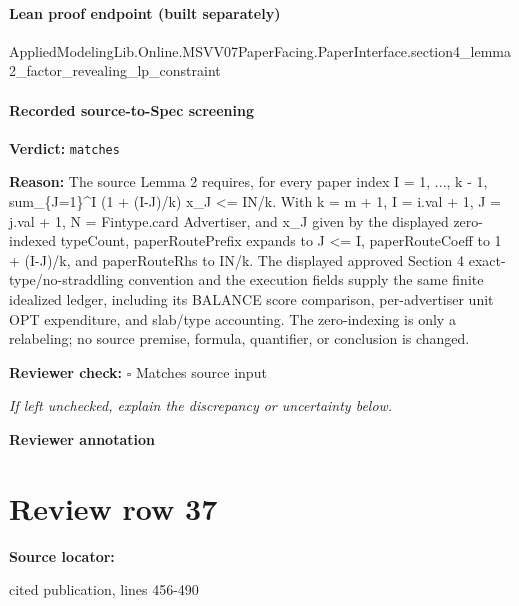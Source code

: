 \documentclass[10pt]{article}
\newcommand{\reviewerbox}{%
  \par\noindent\fbox{\parbox{0.96\linewidth}{\rule{0pt}{0.38in}}}\par
}
\newcommand{\reviewmatch}[1]{%
  \par\noindent\textbf{Reviewer check:} $\square$\; #1\par
  \noindent\emph{If left unchecked, explain the discrepancy or uncertainty below.}\par
}
\begin{document}
\paragraph{Lean proof endpoint (built separately)}\begin{ReviewVerbatim}
AppliedModelingLib.Online.MSVV07PaperFacing.PaperInterface.section4_lemma2_factor_revealing_lp_constraint
\end{ReviewVerbatim}

\paragraph{Recorded source-to-Spec screening}
\textbf{Verdict:} \texttt{matches}
\\
{\raggedright
\textbf{Reason:} The source Lemma 2 requires, for every paper index I = 1, .\allowbreak{}.\allowbreak{}.\allowbreak{}, k -\allowbreak{} 1, sum\_\allowbreak{}\{J=1\}\textasciicircum{}I (1 + (I-\allowbreak{}J)/\allowbreak{}k) x\_\allowbreak{}J <= IN/\allowbreak{}k.\allowbreak{}  With k = m + 1, I = i.\allowbreak{}val + 1, J = j.\allowbreak{}val + 1, N = Fintype.\allowbreak{}card Advertiser, and x\_\allowbreak{}J given by the displayed zero-\allowbreak{}indexed typeCount, paperRoutePrefix expands to J <= I, paperRouteCoeff to 1 + (I-\allowbreak{}J)/\allowbreak{}k, and paperRouteRhs to IN/\allowbreak{}k.\allowbreak{}  The displayed approved Section 4 exact-\allowbreak{}type/\allowbreak{}no-\allowbreak{}straddling convention and the execution fields supply the same finite idealized ledger, including its BALANCE score comparison, per-\allowbreak{}advertiser unit OPT expenditure, and slab/\allowbreak{}type accounting.\allowbreak{}  The zero-\allowbreak{}indexing is only a relabeling;\allowbreak{} no source premise, formula, quantifier, or conclusion is changed.\allowbreak{}
\par}
\reviewmatch{Matches source input}
\noindent\textbf{Reviewer annotation}\par
\reviewerbox
\clearpage
\hypertarget{source-claim-44c0f6f2d0adaf12}{}
\section*{Review row 37}
\textbf{Source locator:} {\footnotesize\raggedright cited publication, lines 456-\allowbreak{}490\par}
\end{document}
